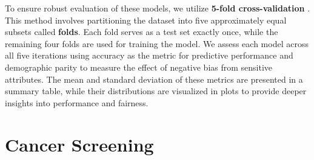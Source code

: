 To ensure robust evaluation of these models, we utilize \textbf{5-fold cross-validation} \cite{k_fold}.
This method involves partitioning the dataset into five approximately equal subsets called \textbf{folds}.
Each fold serves as a test set exactly once, while the remaining four folds are used for training the model.
We assess each model across all five iterations using accuracy as the metric for predictive performance
and demographic parity to measure the effect of negative bias from sensitive attributes.
The mean and standard deviation of these metrics are presented in a summary table,
while their distributions are visualized in plots to provide deeper insights into performance and fairness.

\section{Cancer Screening}


